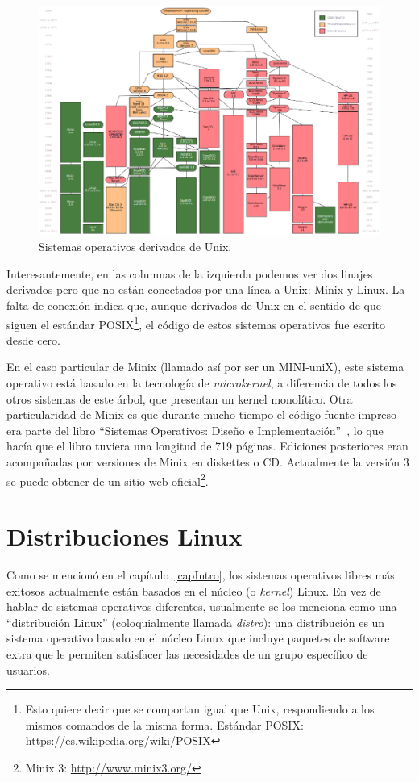 \begin{figure}[h!]
\centering
\includegraphics[scale=.5]{imagenes/arbolUnix.eps}
\caption{Sistemas operativos derivados de Unix.}
\label{figDerivUnix}
\end{figure}

Interesantemente, en las columnas de la izquierda podemos ver dos linajes derivados pero que no están conectados por una línea a Unix: Minix y Linux. La falta de conexión indica que, aunque derivados de Unix en el sentido de que siguen el estándar POSIX\footnote{Esto quiere decir que se comportan igual que Unix, respondiendo a los mismos comandos de la misma forma. Estándar POSIX: \url{https://es.wikipedia.org/wiki/POSIX}}, el código de estos sistemas operativos fue escrito desde cero. 

En el caso particular de Minix (llamado así por ser un MINI-uniX), este sistema operativo está basado en la tecnología de \emph{microkernel}, a diferencia de todos los otros sistemas de este árbol, que presentan un kernel monolítico. Otra particularidad de Minix es que durante mucho tiempo el código fuente impreso era parte del libro ``Sistemas Operativos: Diseño e Implementación''~\cite{tanenbaum87}, lo que hacía que el libro tuviera una longitud de 719 páginas. Ediciones posteriores eran acompañadas por versiones de Minix en diskettes o CD. Actualmente la versión 3 se puede obtener de un sitio web oficial\footnote{Minix 3: \url{http://www.minix3.org/}}.
	
\section{Distribuciones Linux}

Como se mencionó en el capítulo~\ref{capIntro}, los sistemas operativos libres más exitosos actualmente están basados en el núcleo (o \emph{kernel}) Linux. En vez de hablar de sistemas operativos diferentes, usualmente se los menciona como una ``distribución Linux'' (coloquialmente llamada \emph{distro}): una distribución es un sistema operativo basado en el núcleo Linux que incluye paquetes de software extra que le permiten satisfacer las necesidades de un grupo específico de usuarios. 

